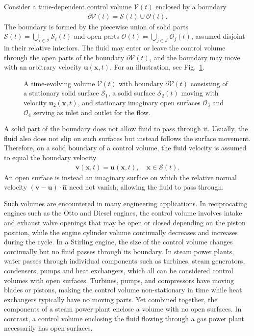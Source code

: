 Consider a time-dependent control volume $\mathcal{V}(t)$ enclosed by a boundary
\begin{align}
    \partial \mathcal{V}(t)=\mathcal{S}(t)\cup\mathcal{O}(t).
\end{align}
The boundary is formed by the piecewise union of solid parts $\mathcal{S}(t)=\bigcup_{i\in\mathcal{I}}\mathcal{S}_{i}(t)$ and open parts $\mathcal{O}(t)=\bigcup_{j\in\mathcal{J}}\mathcal{O}_j(t)$, assumed disjoint in their relative interiors. The fluid may enter or leave the control volume through the open parts of the boundary $\partial\mathcal{V}(t)$, and the boundary may move with an arbitrary velocity $\bm{u}(\bm{x},t)$. For an illustration, see Fig.~\ref{fig:control-volume}.
\begin{figure}[!htb]
    \centering
    
    \caption{A time-evolving volume $\mathcal{V}(t)$ with boundary $\partial\mathcal{V}(t)$ consisting of a stationary solid surface $\mathcal{S}_1$, a solid surface $\mathcal{S}_2(t)$ moving with velocity $\bm{u}_2(\bm{x},t)$, and stationary imaginary open surfaces $\mathcal{O}_3$ and $\mathcal{O}_4$ serving as inlet and outlet for the flow.}
    \label{fig:control-volume}
\end{figure}

A solid part of the boundary does not allow fluid to pass through it. Usually, the fluid also does not slip on such surfaces but instead follows the surface movement. Therefore, on a solid boundary of a control volume, the fluid velocity is assumed to equal the boundary velocity
\begin{align}
    \bm{v}(\bm{x},t)=\bm{u}(\bm{x},t),\quad \bm{x}\in \mathcal{S}(t).
\end{align}
An open surface is instead an imaginary surface on which the relative normal velocity $(\bm{v}-\bm{u})\cdot\hat{\bm{n}}$ need not vanish, allowing the fluid to pass through. 

Such volumes are encountered in many engineering applications. In reciprocating engines such as the Otto and Diesel engines, the control volume involves intake and exhaust valve openings that may be open or closed depending on the piston position, while the engine cylinder volume continually decreases and increases during the cycle. In a Stirling engine, the size of the control volume changes continually but no fluid passes through its boundary. In steam power plants, water passes through individual components such as turbines, steam generators, condensers, pumps and heat exchangers, which all can be considered control volumes with open surfaces. Turbines, pumps, and compressors have moving blades or pistons, making the control volume non-stationary in time while heat exchangers typically have no moving parts. Yet combined together, the components of a steam power plant enclose a volume with no open surfaces. In contrast, a control volume enclosing the fluid flowing through a gas power plant necessarily has open surfaces.

